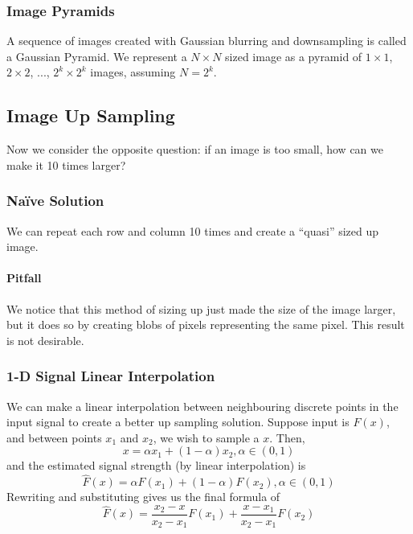 \documentclass[11pt]{article}
\begin{document}
\subsubsection{Image Pyramids}
A sequence of images created with Gaussian blurring and downsampling is called a Gaussian Pyramid. We represent a $N \times N$ sized image as a pyramid of $1 \times 1$, $2 \times 2$, ..., $2^k \times 2^k$ images, assuming $N = 2^k$. 

\subsection{Image Up Sampling}
Now we consider the opposite question: if an image is too small, how can we make it 10 times larger? 

\subsubsection{Na\"ive Solution}
We can repeat each row and column 10 times and create a ``quasi'' sized up image. 
\paragraph{Pitfall} We notice that this method of sizing up just made the size of the image larger, but it does so by creating blobs of pixels representing the same pixel. This result is not desirable. 

\subsubsection{1-D Signal Linear Interpolation}
We can make a linear interpolation between neighbouring discrete points in the input signal to create a better up sampling solution. Suppose input is $F(x)$, and between points $x_1$ and $x_2$, we wish to sample a $x$. Then, 
\begin{equation}
	x = \alpha x_1 + (1 - \alpha ) x_2, \alpha \in (0, 1)
\end{equation}
and the estimated signal strength (by linear interpolation) is
\begin{equation}
	\hat F(x) = \alpha F(x_1) + ( 1 - \alpha ) F (x_2) , \alpha \in (0, 1)
\end{equation}
Rewriting and substituting gives us the final formula of 
\begin{equation}
	\hat F(x) = \frac{x_{2}-x}{x_{2}-x_{1}} F\left(x_{1}\right)+\frac{x-x_{1}}{x_{2}-x_{1}} F\left(x_{2}\right)
\end{equation}
\end{document}
